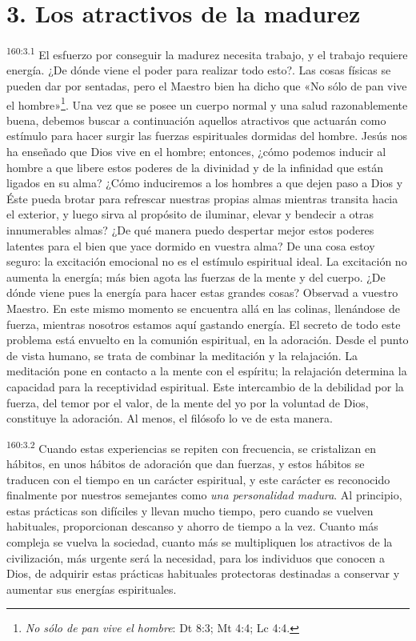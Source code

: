 \section*{3. Los atractivos de la madurez}
\par 
\textsuperscript{160:3.1} El esfuerzo por conseguir la madurez necesita trabajo, y el trabajo requiere energía. ¿De dónde viene el poder para realizar todo esto?. Las cosas físicas se pueden dar por sentadas, pero el Maestro bien ha dicho que «No sólo de pan vive el hombre»\footnote{\textit{No sólo de pan vive el hombre}: Dt 8:3; Mt 4:4; Lc 4:4.}. Una vez que se posee un cuerpo normal y una salud razonablemente buena, debemos buscar a continuación aquellos atractivos que actuarán como estímulo para hacer surgir las fuerzas espirituales dormidas del hombre. Jesús nos ha enseñado que Dios vive en el hombre; entonces, ¿cómo podemos inducir al hombre a que libere estos poderes de la divinidad y de la infinidad que están ligados en su alma? ¿Cómo induciremos a los hombres a que dejen paso a Dios y Éste pueda brotar para refrescar nuestras propias almas mientras transita hacia el exterior, y luego sirva al propósito de iluminar, elevar y bendecir a otras innumerables almas? ¿De qué manera puedo despertar mejor estos poderes latentes para el bien que yace dormido en vuestra alma? De una cosa estoy seguro: la excitación emocional no es el estímulo espiritual ideal. La excitación no aumenta la energía; más bien agota las fuerzas de la mente y del cuerpo. ¿De dónde viene pues la energía para hacer estas grandes cosas? Observad a vuestro Maestro. En este mismo momento se encuentra allá en las colinas, llenándose de fuerza, mientras nosotros estamos aquí gastando energía. El secreto de todo este problema está envuelto en la comunión espiritual, en la adoración. Desde el punto de vista humano, se trata de combinar la meditación y la relajación. La meditación pone en contacto a la mente con el espíritu; la relajación determina la capacidad para la receptividad espiritual. Este intercambio de la debilidad por la fuerza, del temor por el valor, de la mente del yo por la voluntad de Dios, constituye la adoración. Al menos, el filósofo lo ve de esta manera.

\par 
\textsuperscript{160:3.2} Cuando estas experiencias se repiten con frecuencia, se cristalizan en hábitos, en unos hábitos de adoración que dan fuerzas, y estos hábitos se traducen con el tiempo en un carácter espiritual, y este carácter es reconocido finalmente por nuestros semejantes como \textit{una personalidad madura}. Al principio, estas prácticas son difíciles y llevan mucho tiempo, pero cuando se vuelven habituales, proporcionan descanso y ahorro de tiempo a la vez. Cuanto más compleja se vuelva la sociedad, cuanto más se multipliquen los atractivos de la civilización, más urgente será la necesidad, para los individuos que conocen a Dios, de adquirir estas prácticas habituales protectoras destinadas a conservar y aumentar sus energías espirituales.

